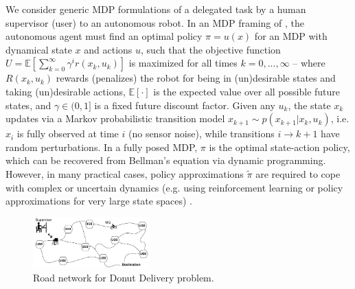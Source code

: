 We consider generic MDP formulations of a delegated task \task{} by a human supervisor (user) to an autonomous robot. In an MDP framing of \task{}, the autonomous agent must find an optimal policy $\pi = u(x)$ for an MDP with dynamical state $x$ and actions $u$, such that the objective function
$U = \mathbb{E} \left[\sum_{k=0}^{\infty} \gamma^i r(x_k,u_k) \right]$ is maximized for all times $k=0,...,\infty$ --  
where $R(x_k,u_k)$ rewards (penalizes) the robot for being in (un)desirable states and taking (un)desirable actions, $\mathbb{E}[\cdot]$ is the expected value over all possible future states, and $\gamma \in (0,1]$ is a fixed future discount factor. 
Given any $u_k$, the state $x_k$ updates via a Markov probabilistic transition model $x_{k+1} \sim p(x_{k+1}|x_{k},u_{k})$,  
i.e. $x_{i}$ is fully observed at time $i$ (no sensor noise), while transitions $i\rightarrow k+1$ have random perturbations.
In a fully posed MDP, $\pi$ is the optimal state-action policy, which can be recovered from Bellman's equation via dynamic programming. 
However, in many practical cases, policy approximations $\tilde{\pi}$ are required to cope with complex or uncertain dynamics (e.g. using reinforcement learning or policy approximations for very large state spaces) \cite{Kochenderfer2015-uu}. 
\begin{figure}[t]%
    	\centering
     	\includegraphics[width=0.4\textwidth]{Figures/RoadNet}
    	\caption{Road network for Donut Delivery problem.} 
        \label{fig:RoadNet}
        \vspace{-0.2cm}
\end{figure}    
    
